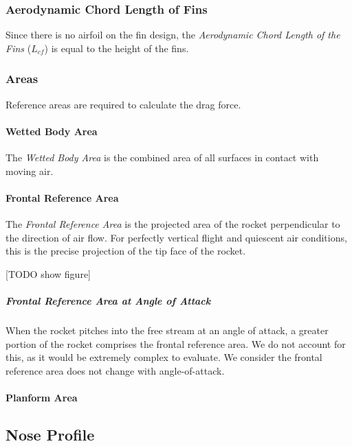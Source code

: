 \documentclass[]{article}
\let\oldparagraph\paragraph
\renewcommand{\paragraph}[1]{\oldparagraph{#1}\mbox{}}
\let\oldsubparagraph\subparagraph
\renewcommand{\subparagraph}[1]{\oldsubparagraph{#1}\mbox{}}
\begin{document}
\subsubsection{Aerodynamic Chord Length of
Fins}\label{aerodynamic-chord-length-of-fins}

Since there is no airfoil on the fin design, the \emph{Aerodynamic Chord
Length of the Fins} (\(L_{cf}\)) is equal to the height of the fins.

\subsubsection{Areas}\label{areas}

Reference areas are required to calculate the drag force.

\paragraph{Wetted Body Area}\label{wetted-body-area}

The \emph{Wetted Body Area} is the combined area of all surfaces in
contact with moving air.

\paragraph{Frontal Reference Area}\label{frontal-reference-area}

The \emph{Frontal Reference Area} is the projected area of the rocket
perpendicular to the direction of air flow. For perfectly vertical
flight and quiescent air conditions, this is the precise projection of
the tip face of the rocket.

{[}TODO show figure{]}

\subparagraph{Frontal Reference Area at Angle of
Attack}\label{frontal-reference-area-at-angle-of-attack}

When the rocket pitches into the free stream at an angle of attack, a
greater portion of the rocket comprises the frontal reference area. We
do not account for this, as it would be extremely complex to evaluate.
We consider the frontal reference area does not change with
angle-of-attack.

\paragraph{Planform Area}\label{planform-area}

\subsection{Nose Profile}\label{nose-profile}
\end{document}
